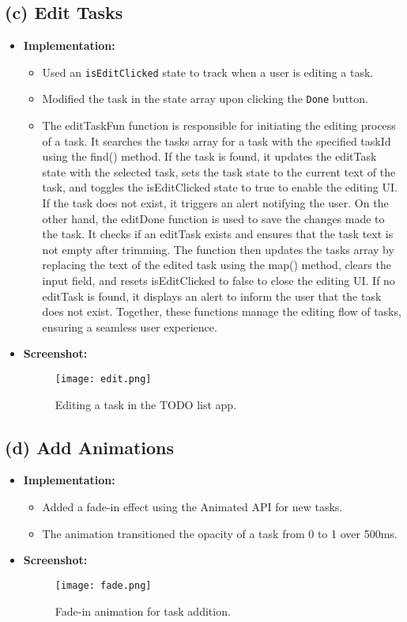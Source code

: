 \documentclass{article}
\begin{document}
\subsection*{(c) Edit Tasks}
\begin{itemize}
    \item \textbf{Implementation:}
    \begin{itemize}
        \item Used an \texttt{isEditClicked} state to track when a user is editing a task.
        \item Modified the task in the state array upon clicking the \texttt{Done} button.
         \item  The editTaskFun function is responsible for initiating the editing process of a task. It searches the tasks array for a task with the specified taskId using the find() method. If the task is found, it updates the editTask state with the selected task, sets the task state to the current text of the task, and toggles the isEditClicked state to true to enable the editing UI. If the task does not exist, it triggers an alert notifying the user. On the other hand, the editDone function is used to save the changes made to the task. It checks if an editTask exists and ensures that the task text is not empty after trimming. The function then updates the tasks array by replacing the text of the edited task using the map() method, clears the input field, and resets isEditClicked to false to close the editing UI. If no editTask is found, it displays an alert to inform the user that the task does not exist. Together, these functions manage the editing flow of tasks, ensuring a seamless user experience.
    \end{itemize}
    \item \textbf{Screenshot:}
    \begin{figure}[h!]
    \centering
    \texttt{[image: edit.png]}
    \caption{Editing a task in the TODO list app.}
    \end{figure}
\end{itemize}

\subsection*{(d) Add Animations}
\begin{itemize}
    \item \textbf{Implementation:}
    \begin{itemize}
        \item Added a fade-in effect using the Animated API for new tasks.
        \item The animation transitioned the opacity of a task from 0 to 1 over 500ms.
    \end{itemize}
    \item \textbf{Screenshot:}
    \begin{figure}[h!]
    \centering
    \texttt{[image: fade.png]}
    \caption{Fade-in animation for task addition.}
    \end{figure}
\end{itemize}
\end{document}
